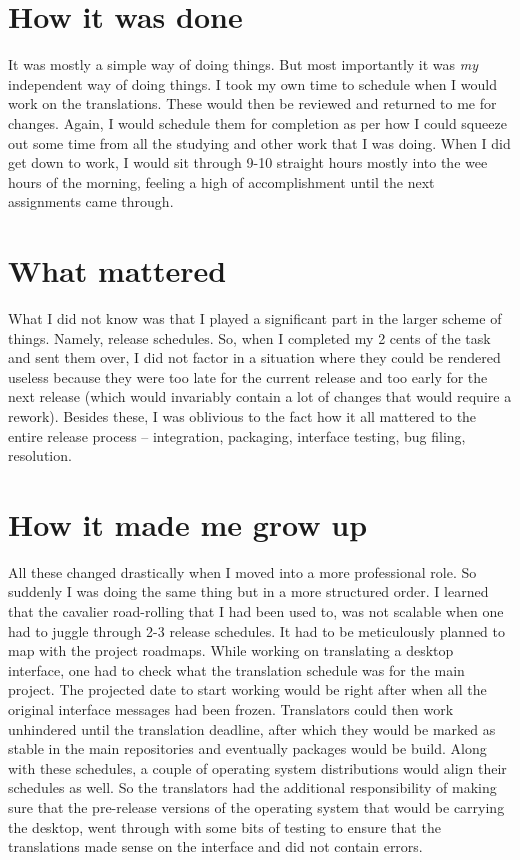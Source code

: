 \section*{How it was done}

It was mostly a simple way of doing things. But most importantly it was
\textit{my} independent way of doing things. I took my own time to schedule when
I would work on the translations. These would then be reviewed and returned to
me for changes. Again, I would schedule them for completion as per how I could
squeeze out some time from all the studying and other work that I was doing.
When I did get down to work, I would sit through 9-10 straight hours mostly into
the wee hours of the morning, feeling a high of accomplishment until the next
assignments came through.

\section*{What mattered}

What I did not know was that I played a significant part in the larger scheme of
things. Namely, release schedules. So, when I completed my 2 cents of the task
and sent them over, I did not factor in a situation where they could be rendered
useless because they were too late for the current release and too early for the
next release (which would invariably contain a lot of changes that would require
a rework). Besides these, I was oblivious to the fact how it all mattered to the
entire release process -- integration, packaging, interface testing, bug filing,
resolution.

\section*{How it made me grow up}

All these changed drastically when I moved into a more professional role. So
suddenly I was doing the same thing but in a more structured order. I learned
that the cavalier road-rolling that I had been used to, was not scalable when
one had to juggle through 2-3 release schedules. It had to be meticulously
planned to map with the project roadmaps. While working on translating a desktop
interface, one had to check what the translation schedule was for the main
project. The projected date to start working would be right after when all the
original interface messages had been frozen. Translators could then work
unhindered until the translation deadline, after which they would be marked as
stable in the main repositories and eventually packages would be build. Along
with these schedules, a couple of operating system
distributions would align their schedules as well. So the translators had the
additional responsibility of making sure that the pre-release versions of the
operating system that would be carrying the desktop, went through with some bits
of testing to ensure that the translations made sense on the interface and did
not contain errors.

